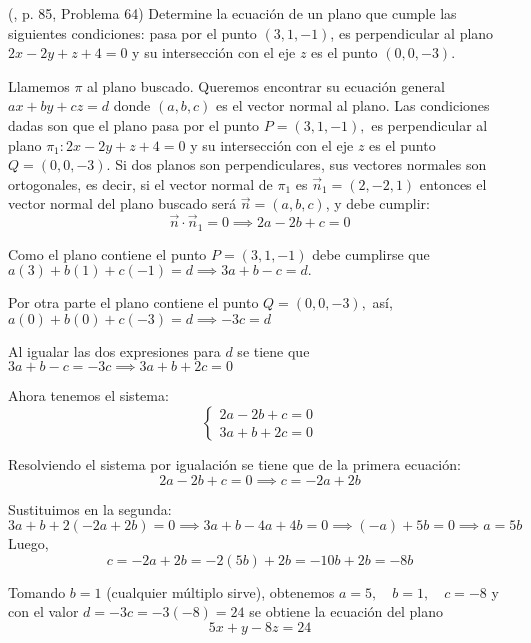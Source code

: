 \begin{prob} (\cite{espinoza2006Algebralineal}, p. 85, Problema 64) Determine la ecuación de un plano que cumple las siguientes condiciones: pasa por el punto $(3,1,-1)$, es perpendicular al plano $2x-2y+z+4=0$ y su intersección con el eje $z$ es el punto $(0,0,-3)$. 

\begin{myproof}
Llamemos $\pi$ al plano buscado. Queremos encontrar su ecuación general \(
ax + by + cz = d \) donde $(a,b,c)$ es el vector normal al plano. Las condiciones dadas son que el plano pasa por el punto $P = (3,1,-1), $ es perpendicular al plano $\pi_1: 2x-2y+z+4=0$ y su intersección con el eje $z$ es el punto $Q = (0,0,-3)$. Si dos planos son perpendiculares, sus vectores normales son ortogonales, es decir, si el vector normal de $\pi_1$ es $\vec{n}_1 = (2,-2,1)$ entonces el vector normal del plano buscado será $\vec{n} = (a,b,c)$, y debe cumplir:
\[
\vec{n} \cdot \vec{n}_1 = 0 \implies 2a - 2b + c = 0
\]

Como el plano contiene el punto $P = (3,1,-1)$ debe cumplirse que \(
a(3) + b(1) + c(-1) = d \implies 3a + b - c = d.\)

Por otra parte el plano contiene el punto $Q = (0,0,-3),$ así, \(a(0) + b(0) + c(-3) = d \implies -3c = d \)

Al igualar las dos expresiones para $d$ se tiene que \(3a + b - c = -3c \implies 3a + b + 2c = 0 \)

Ahora tenemos el sistema:
\[
\begin{cases}
2a - 2b + c = 0 \\
3a + b + 2c = 0
\end{cases}
\]


Resolviendo el sistema por igualación se tiene que de la primera ecuación:
\[
2a - 2b + c = 0 \implies c = -2a + 2b
\]

Sustituimos en la segunda:
\[
3a + b + 2(-2a + 2b) = 0 \implies 3a + b -4a + 4b = 0 \implies
(-a) + 5b = 0 \implies a = 5b
\]
Luego,
\[
c = -2a + 2b = -2(5b) + 2b = -10b + 2b = -8b
\]

Tomando $b = 1$ (cualquier múltiplo sirve), obtenemos \(a = 5,\quad b = 1,\quad c = -8 \) y con el valor \(d = -3c = -3(-8) = 24\) se obtiene la ecuación del plano 
\[
\boxed{5x + y - 8z = 24}
\]
\end{myproof}

\end{prob}

